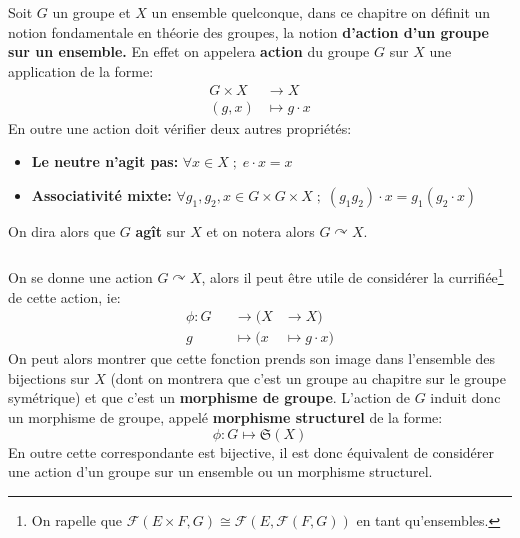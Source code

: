 \chapter*{}
Soit \( G \) un groupe et \( X \) un ensemble quelconque, dans ce chapitre on définit un notion fondamentale en théorie des groupes, la notion \textbf{d'action d'un groupe sur un ensemble.} En effet on appelera \textbf{action} du groupe \( G \) sur \( X \) une application de la forme:
\[ 
   \begin{aligned}
      G \times X &\longrightarrow X\\
      (g, x) &\longmapsto g \cdot x
   \end{aligned}
\]
En outre une action doit vérifier deux autres propriétés:
\begin{itemize}
   \item \textbf{Le neutre n'agit pas: } \( \forall x \in X \; ; \; e \cdot x = x \)
   \item \textbf{Associativité mixte: } \( \forall g_1, g_2, x \in G \times G \times X \; ; \; (g_1g_2) \cdot x = g_1(g_2 \cdot x) \)
\end{itemize}
On dira alors que \( G \) \textbf{agît} sur \( X \) et on notera alors \( G \curvearrowright X \).

\subsection*{}
On se donne une action \( G \curvearrowright X\), alors il peut être utile de considérer la currifiée\footnote[1]{On rapelle que \( \mathcal{F}(E \times F, G) \cong \mathcal{F}(E, \mathcal{F}(F, G)) \) en tant qu'ensembles.} de cette action, ie:
\[ 
   \begin{aligned}
      \phi : G &&\longrightarrow (X &\longrightarrow X)\\
      g &&\longmapsto (x &\longmapsto g \cdot x)
   \end{aligned}
\]
On peut alors montrer que cette fonction prends son image dans l'ensemble des bijections sur \( X \) (dont on montrera que c'est un groupe au chapitre sur le groupe symétrique) et que c'est un \textbf{morphisme de groupe}. L'action de \( G \) induit donc un morphisme de groupe, appelé \textbf{morphisme structurel} de la forme:
\[ 
   \phi : G \longmapsto \mathfrak{S}(X)
\]
En outre cette correspondante est bijective, il est donc équivalent de considérer une action d'un groupe sur un ensemble ou un morphisme structurel.

